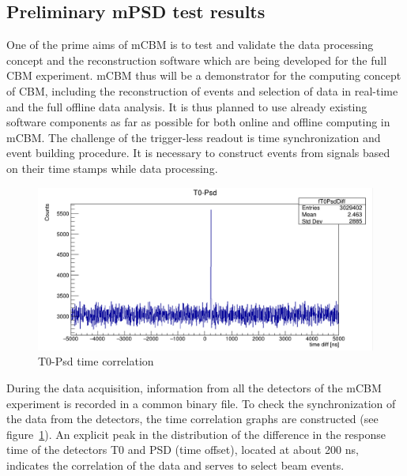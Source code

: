 \documentclass[a4paper,11pt]{article}
\begin{document}
\subsection{Preliminary mPSD test results}
One of the prime aims of mCBM is to test and validate the data processing concept and the reconstruction software which are being developed for the full CBM experiment. mCBM thus will be a demonstrator for the computing concept of CBM, including the reconstruction of events and selection of data in real-time and the full offline data analysis. It is thus planned to use already existing software components as far as possible for both online and offline computing in mCBM.
The challenge of the trigger-less readout is time synchronization and event building procedure. It is necessary to construct events from signals based on their time stamps while data processing.

\begin{figure}[htbp]
\centering %
\includegraphics[width=\textwidth]{run582T0Psd.png}

\caption{\label{fig:6} T0-Psd time correlation}
\end{figure}

During the data acquisition, information from all the detectors of the mCBM experiment is recorded in a common binary file. To check the synchronization of the data from the detectors, the time correlation graphs are constructed (see figure~\ref{fig:6}). An explicit peak in the distribution of the difference in the response time of the detectors T0 and PSD (time offset), located at about 200 ns, indicates the correlation of the data and serves to select beam events.
\end{document}
